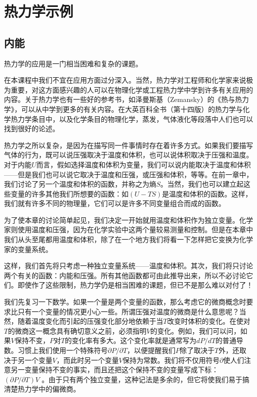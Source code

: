 \chapter{热力学示例}

\section{内能}

热力学的应用是一门相当困难和复杂的课题。

在本课程中我们不宜在应用方面过分深入。当然，热力学对工程师和化学家来说极为重要，对这方面感兴趣的人可以在物理化学或工程热力学中学到许多有关应用的内容。关于热力学也有一些好的参考书，如泽曼斯基（Zemansky）的《热与热力学》，可以从中学到更多的有关内容。在大英百科全书（第十四版）的热力学与化学热力学条目中，以及化学条目的物理化学，蒸发，气体液化等段落中人们也可以找到很好的论述。

热力学之所以复杂，是因为在描写同一件事情时存在着许多方式。如果我们要描写气体的行为，既可以说压强取决于温度和体积，也可以说体积取决于压强和温度。对于内能$U$而言，假如选择温度和体积为变量，我们可以说内能取决于温度和体积——但是我们也可以说它取决于温度和压强，或压强和体积，等等。在前一章中，我们讨论了另一个温度和体积的函数，并称之为熵$S$。当然，我们也可以建立起这些变量的许多其他我们所想要的函数：如$(U-TS)$是温度和体积的函数。这样，我们就有许多不同的物理量，它们可以是许多不同变量组合而成的函数。

为了使本章的讨论简单起见，我们决定一开始就用温度和体积作为独立变量。化学家则使用温度和压强，因为在化学实验中这两个量较易测量和控制。但是在本章中我们从头至尾都用温度和体积，除了在一个地方我们将看一下怎样把它变换为化学家的变量系统。

这样，我们首先将只考虑一种独立变量系统——温度和体积。其次，我们将只讨论两个有关的函数：内能和压强。所有其他函数都可由此推导出来，所以不必讨论它们。即使作了这些限制，热力学仍是相当困难的课题，但已不是那么难以对付了！

我们先复习一下数学。如果一个量是两个变量的函数，那么考虑它的微商概念时要求比只有一个变量的情况更小心一些。所谓压强对温度的微商是什么意思呢？当然，随着温度变化而引起的压强变化部分地依赖于当$T$改变时体积的变化。在使对$T$的微商这一概念具有确切意义之前，必须指明$V$的变化。例如，我们可以问，如果$V$保持不变，$P$对$T$的变化率有多大。这个变化率就是通常写为$dP /dT$的普通导数。习惯上我们使用一个特殊符号$\partial P /\partial T$，以便提醒我们$P$除了取决于$T$外，还取决于另一个变量$V$，而此时另一个变量$V$保持为常数。我们将不仅用符号$\partial$使人们注意另一变量保持不变的事实，而且还把这个保持不变的变量写成下标：$(\partial P /\partial T)V$ 。由于只有两个独立变量，这种记法是多余的，但它将使我们易于搞清楚热力学中的偏微商。

